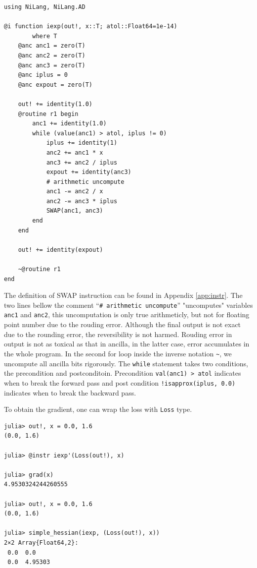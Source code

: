 \documentclass[aps,twocolumn,longbibliography,english,superscriptaddress,prr]{revtex4-1}
\newcommand{\<}{\langle}
\renewcommand{\>}{\rangle}
\newcommand{\App}[1]{Appendix \ref{#1}}
\theoremstyle{definition}\newtheorem{definition}{\textit{Definition}}
\begin{document}
\begin{minipage}{.44\textwidth}
\begin{lstlisting}
using NiLang, NiLang.AD

@i function iexp(out!, x::T; atol::Float64=1e-14)
        where T
    @anc anc1 = zero(T)
    @anc anc2 = zero(T)
    @anc anc3 = zero(T)
    @anc iplus = 0
    @anc expout = zero(T)

    out! += identity(1.0)
    @routine r1 begin
        anc1 += identity(1.0)
        while (value(anc1) > atol, iplus != 0)
            iplus += identity(1)
            anc2 += anc1 * x
            anc3 += anc2 / iplus
            expout += identity(anc3)
            # arithmetic uncompute
            anc1 -= anc2 / x
            anc2 -= anc3 * iplus
            SWAP(anc1, anc3)
        end
    end

    out! += identity(expout)

    ~@routine r1
end
\end{lstlisting}
\end{minipage}

The definition of SWAP instruction can be found in \App{app:instr}.
The two lines bellow the comment ``\texttt{\# arithmetic uncompute}'' "uncomputes" variables \texttt{anc1} and \texttt{anc2}, this uncomputation is only true arithmeticly, but not for floating point number due to the rouding error.
Although the final output is not exact due to the rounding error, the reversibility is not harmed.
Rouding error in output is not as toxical as that in ancilla, in the latter case, error accumulates in the whole program.
In the second for loop inside the inverse notation \texttt{\~}, we uncompute all ancilla bits rigorously.
The \texttt{while} statement takes two conditions, the precondition and postconditoin. Precondition \texttt{val(anc1) > atol} indicates when to break the forward pass and post condition \texttt{!isapprox(iplus, 0.0)} indicates when to break the backward pass.

To obtain the gradient, one can wrap the loss with \texttt{Loss} type.

\begin{minipage}{.44\textwidth}
\begin{lstlisting}
julia> out!, x = 0.0, 1.6
(0.0, 1.6)

julia> @instr iexp'(Loss(out!), x)

julia> grad(x)
4.9530324244260555

julia> out!, x = 0.0, 1.6
(0.0, 1.6)

julia> simple_hessian(iexp, (Loss(out!), x))
2×2 Array{Float64,2}:
 0.0  0.0
 0.0  4.95303
\end{lstlisting}
\end{minipage}
\end{document}
